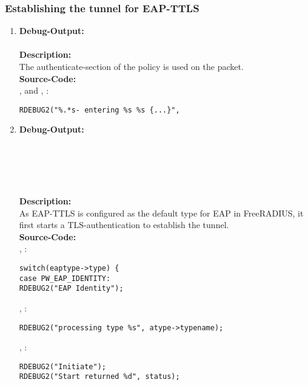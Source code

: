 \subsubsection*{Establishing the tunnel for EAP-TTLS}
\label{section:establishing_the_tunnel_for_eap_ttls}
\begin{enumerate}
\item \textbf{Debug-Output:}\\
\\
\newline
\textbf{Description:}\\
The authenticate-section of the policy is used on the packet.\\
\newline
\textbf{Source-Code:}\\
,  and , :
\begin{lstlisting}
RDEBUG2("%.*s- entering %s %s {...}",
\end{lstlisting}

\item \textbf{Debug-Output:}\\
\\\
\\
\\
\\
\\
\newline
\textbf{Description:}\\
As EAP-TTLS is configured as the default type for EAP in FreeRADIUS, it first starts a TLS-authentication to establish the tunnel.\\
\newline
\textbf{Source-Code:}\\
, :
\begin{lstlisting}
switch(eaptype->type) {
case PW_EAP_IDENTITY:
RDEBUG2("EAP Identity");
\end{lstlisting}
, :
\begin{lstlisting}
RDEBUG2("processing type %s", atype->typename);
\end{lstlisting}
, :
\begin{lstlisting}
RDEBUG2("Initiate");
RDEBUG2("Start returned %d", status);
\end{lstlisting}


\end{enumerate}

